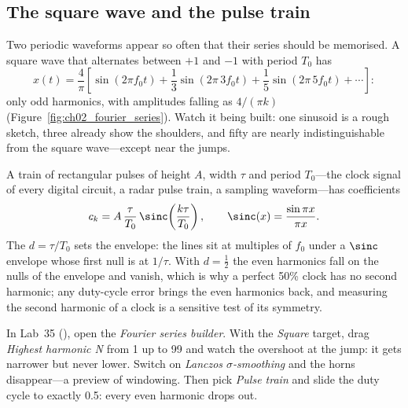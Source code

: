 \subsection{The square wave and the pulse train}

Two periodic waveforms appear so often that their series should be memorised. A square wave
that alternates between $+1$ and $-1$ with period $T_0$ has
\begin{equation}
x(t)=\frac{4}{\pi}\left[\sin(2\pi f_0t)+\frac13\sin(2\pi\,3f_0t)+\frac15\sin(2\pi\,5f_0t)+\cdots\right]:
\end{equation}
only odd harmonics, with amplitudes falling as $4/(\pi k)$ (Figure~\ref{fig:ch02_fourier_series}).
Watch it being built: one sinusoid is a rough sketch, three already show the shoulders, and fifty
are nearly indistinguishable from the square wave---except near the jumps.


A train of rectangular pulses of height $A$, width $\tau$ and period $T_0$---the clock signal of every
digital circuit, a radar pulse train, a sampling waveform---has coefficients
\begin{equation}
c_k=A\,\frac{\tau}{T_0}\,\sinc\!\left(\frac{k\tau}{T_0}\right),\qquad
\sinc(x)=\frac{\sin\pi x}{\pi x}.
\label{eq:ch02:pulsetrain}
\end{equation}
The  $d=\tau/T_0$ sets the envelope: the lines sit at multiples of $f_0$ under a
$\sinc$ envelope whose first null is at $1/\tau$. With $d=\tfrac12$ the even harmonics fall on the
nulls of the envelope and vanish, which is why a perfect 50\% clock has no second harmonic;
any duty-cycle error brings the even harmonics back, and measuring the second harmonic of a clock
is a sensitive test of its symmetry.

\begin{tryit}
In Lab~35 (), open the \emph{Fourier series builder}. With the
\emph{Square} target, drag \emph{Highest harmonic N} from 1 up to 99 and watch the overshoot at
the jump: it gets narrower but never lower. Switch on \emph{Lanczos $\sigma$-smoothing} and the
horns disappear---a preview of windowing. Then pick \emph{Pulse train} and slide the duty cycle to
exactly 0.5: every even harmonic drops out.
\end{tryit}

